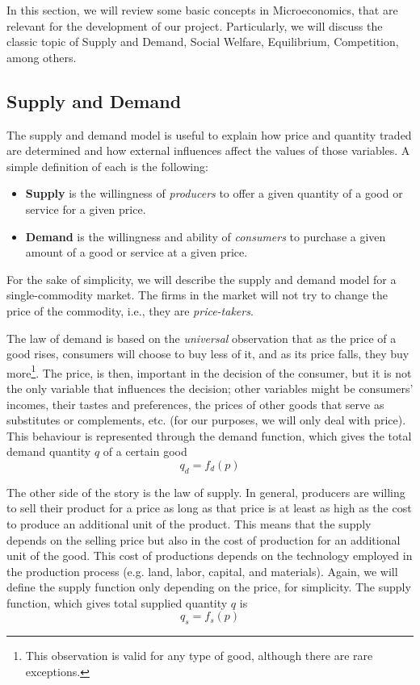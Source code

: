 \documentclass[11pt, letterpaper]{article}
\begin{document}
In this section, we will review some basic concepts in Microeconomics, that are relevant for the development of our project. Particularly, we will discuss the classic topic of Supply and Demand, Social Welfare, Equilibrium, Competition, among others. 

\subsection{Supply and Demand}
The supply and demand model is useful to explain how price and quantity
traded are determined and how external influences affect the values of those variables. A simple definition of each is the following:
\begin{itemize}
    \item[] \textbf{Supply} is the willingness of \textit{producers} to offer a given quantity of a good or service for a given price. 
    \item[] \textbf{Demand} is the willingness and ability of \textit{consumers} to purchase a given amount of a good or service at a given price.
\end{itemize}


For the sake of simplicity, we will describe the supply and demand  model for a single-commodity market. The firms in the market will not try to change the price of the commodity, i.e., they are \textit{price-takers}.

\smallskip

The law of demand is based on the \textit{universal} observation that as the price of a good rises, consumers will choose to buy less of it, and as its price falls, they buy more\footnote{This observation is valid for any type of good, although there are rare exceptions.}. The price, is then, important in the decision of the consumer, but it is not the only variable that influences the decision; other variables might be  consumers' incomes, their tastes and preferences, the prices of other goods that serve as substitutes or complements, etc. (for our purposes, we will only deal with price).  
This behaviour is represented through the demand function, which gives the total demand quantity $q$ of a certain good
\begin{equation}
    q_d=f_d(p)
\end{equation}

The other side of the story is the law of supply. In general,
producers are willing to sell their product for a price as long as that price is at least as high as the cost to produce an additional unit of the product. This means that the supply depends on the selling price but also in the cost of production for an additional unit of the good. This cost of productions depends on the technology employed in the production process (e.g. land, labor, capital, and materials). Again, we will define the supply function only depending on the price, for simplicity. 
The supply function, which gives total supplied quantity $q$ is 
\begin{equation}
    q_s=f_s(p)
\end{equation}
\end{document}
